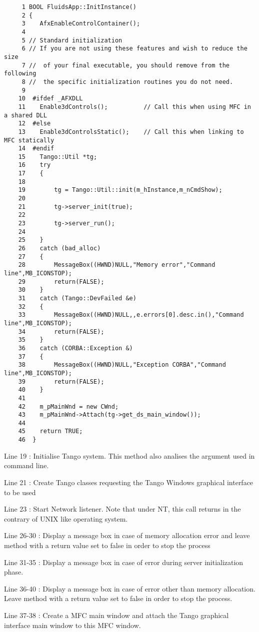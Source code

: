 \begin{verbatim}
     1 BOOL FluidsApp::InitInstance()
     2 {
     3    AfxEnableControlContainer();
     4  
     5 // Standard initialization
     6 // If you are not using these features and wish to reduce the size
     7 //  of your final executable, you should remove from the following
     8 //  the specific initialization routines you do not need.
     9  
    10  #ifdef _AFXDLL
    11    Enable3dControls();          // Call this when using MFC in a shared DLL
    12  #else
    13    Enable3dControlsStatic();    // Call this when linking to MFC statically
    14  #endif
    15    Tango::Util *tg;
    16    try
    17    {
    18          
    19        tg = Tango::Util::init(m_hInstance,m_nCmdShow);
    20  
    21        tg->server_init(true);
    22  
    23        tg->server_run();
    24  
    25    }
    26    catch (bad_alloc)
    27    {
    28        MessageBox((HWND)NULL,"Memory error","Command line",MB_ICONSTOP);
    29        return(FALSE);
    30    }
    31    catch (Tango::DevFailed &e)
    32    {
    33        MessageBox((HWND)NULL,,e.errors[0].desc.in(),"Command line",MB_ICONSTOP);
    34        return(FALSE);
    35    }
    36    catch (CORBA::Exception &)
    37    {
    38        MessageBox((HWND)NULL,"Exception CORBA","Command line",MB_ICONSTOP);
    39        return(FALSE);
    40    }
    41  
    42    m_pMainWnd = new CWnd;
    43    m_pMainWnd->Attach(tg->get_ds_main_window());
    44  
    45    return TRUE;
    46  }
\end{verbatim}


Line 19 : Initialise Tango system. This method also analises the argument
used in command line.

Line 21 : Create Tango classes requesting the Tango Windows graphical
interface to be used

Line 23 : Start Network listener. Note that under NT, this call returns
in the contrary of UNIX like operating system.

Line 26-30 : Display a message box in case of memory allocation error
and leave method with a return value set to false in order to stop
the process

Line 31-35 : Display a message box in case of error during server
initialization phase.

Line 36-40 : Display a message box in case of error other than memory
allocation. Leave method with a return value set to false in order
to stop the process.

Line 37-38 : Create a MFC main window and attach the Tango
graphical interface main window to this MFC window.


